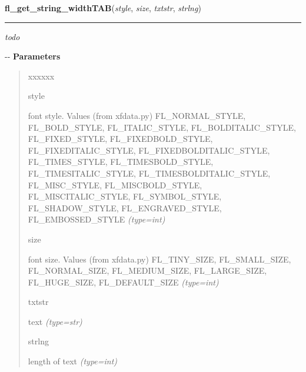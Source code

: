     \label{xformslib:flbasic:fl_get_string_widthTAB}

    \vspace{0.5ex}

\hspace{.8\funcindent}\begin{boxedminipage}{\funcwidth}

    \raggedright \textbf{fl\_get\_string\_widthTAB}(\textit{style}, \textit{size}, \textit{txtstr}, \textit{strlng})

    \vspace{-1.5ex}

    \rule{\textwidth}{0.5\fboxrule}
\setlength{\parskip}{2ex}

\emph{todo}

-{}-
\setlength{\parskip}{1ex}
      \textbf{Parameters}
      \vspace{-1ex}

      \begin{quote}
        \begin{Ventry}{xxxxxx}

          \item[style]


font style. Values (from xfdata.py) FL\_NORMAL\_STYLE, FL\_BOLD\_STYLE,
FL\_ITALIC\_STYLE, FL\_BOLDITALIC\_STYLE, FL\_FIXED\_STYLE,
FL\_FIXEDBOLD\_STYLE, FL\_FIXEDITALIC\_STYLE, FL\_FIXEDBOLDITALIC\_STYLE,
FL\_TIMES\_STYLE, FL\_TIMESBOLD\_STYLE, FL\_TIMESITALIC\_STYLE,
FL\_TIMESBOLDITALIC\_STYLE, FL\_MISC\_STYLE, FL\_MISCBOLD\_STYLE,
FL\_MISCITALIC\_STYLE, FL\_SYMBOL\_STYLE, FL\_SHADOW\_STYLE,
FL\_ENGRAVED\_STYLE, FL\_EMBOSSED\_STYLE
            {\it (type=int)}

          \item[size]


font size. Values (from xfdata.py) FL\_TINY\_SIZE, FL\_SMALL\_SIZE,
FL\_NORMAL\_SIZE, FL\_MEDIUM\_SIZE, FL\_LARGE\_SIZE, FL\_HUGE\_SIZE,
FL\_DEFAULT\_SIZE
            {\it (type=int)}

          \item[txtstr]


text
            {\it (type=str)}

          \item[strlng]


length of text
            {\it (type=int)}

        \end{Ventry}


\end{quote}
\end{boxedminipage}
